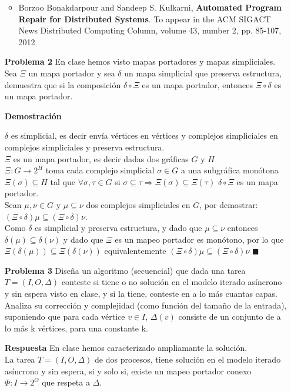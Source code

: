 \documentclass{article}
\begin{document}
\begin{enumerate}
\begin{itemize}
\item Borzoo Bonakdarpour and Sandeep S. Kulkarni, {\bf Automated Program Repair for Distributed Systems}. To appear in the ACM SIGACT News Distributed Computing Column, volume 43, number 2, pp. 85-107, 2012
\end{itemize}

\item[\bf{Problema 2}] En clase hemos visto mapas portadores y mapas simpliciales. Sea $\Xi$ un mapa portador y sea $\delta$ un mapa simplicial que preserva estructura, demuestra que si la composición $\delta \circ \Xi$ es un mapa portador, entonces $\Xi \circ \delta$ es un mapa portador.

\item[\bf{Demostración}] 

$\delta$ es simplicial, es decir envía vértices en vértices y complejos simpliciales en complejos simpliciales y preserva estructura. \\
$\Xi$ es un mapa portador, es decir dadas dos gráficas $G$ y $H$ \\ $\Xi:G \rightarrow 2^H$ toma cada complejo simplicial $\sigma \in G$ a una subgráfica monótona $\Xi(\sigma) \subseteq H$
tal que $\forall \sigma, \tau \in G$ si $\sigma \subseteq \tau \Rightarrow \Xi(\sigma) \subseteq \Xi(\tau)$
$\delta \circ \Xi$ es un mapa portador.\\

Sean $\mu,\nu \in G$ y $\mu \subseteq \nu$ dos complejos simpliciales en $G$, por demostrar: $(\Xi \circ \delta) \mu \subseteq (\Xi \circ \delta) \nu$.\\

Como $\delta$ es simplicial y preserva estructura, y dado que $\mu \subseteq \nu$ entonces $\delta(\mu) \subseteq \delta(\nu)$ y dado que $\Xi$ es un mapeo portador es monótono, por lo que $\Xi(\delta(\mu)) \subseteq \Xi(\delta(\nu)) $ equivalentemente $(\Xi \circ \delta) \mu \subseteq (\Xi \circ \delta) \nu$ $\blacksquare$


\item[\bf{Problema 3}]  Diseña un algoritmo (secuencial) que dada una tarea $T = (I, O, \Delta)$ conteste si tiene o no solución en el modelo iterado asíncrono y sin espera visto en clase, y si la tiene, conteste en a lo más cuantas capas. Analiza su corrección y complejidad (como función del tamaño de la entrada), suponiendo que para cada vértice $v \in I$, $\Delta(v)$ consiste de un conjunto de a lo más k vértices, para una constante k.

\item[\bf{Respuesta}]
En clase hemos caracterizado ampliamante la solución.\\
La tarea $T = (I, O, \Delta)$ de dos procesos, tiene solución en el modelo iterado asíncrono y sin espera, si y solo si, existe un mapeo portador conexo $\Phi: I \rightarrow 2^O$ que respeta a $\Delta$.


\end{enumerate}
\end{document}
